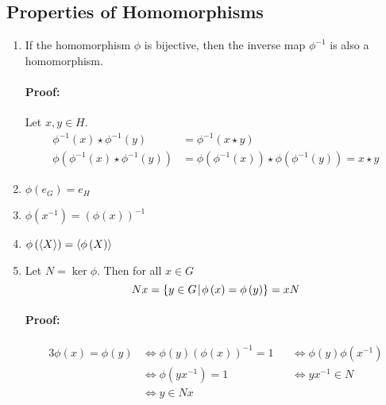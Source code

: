 \documentclass[12pt, oneside]{book}
\DeclarePairedDelimiter{\evdel}{\langle}{\rangle}
\newcommand{\ev}{\evdel}
\newcommand{\given}{\: \vline \:}
\begin{document}
\subsection{Properties of Homomorphisms}
\begin{enumerate}
	\item If the homomorphism \(\phi\) is bijective, then the inverse map \(\phi^{-1}\) is also a homomorphism.
	      \paragraph{Proof:} Let \(x,y \in H\).
	      \begin{align*}
		      \phi^{-1} \left( x \right) \star \phi^{-1} \left( y \right)                   & = \phi^{-1} \left( x \star y \right)                                                                        \\
		      \phi \left( \phi^{-1}\left( x \right) \star \phi^{-1}\left( y \right) \right) & = \phi \left( \phi^{-1} \left(x\right)\right) \star \phi \left( \phi^{-1} \left(y\right)\right) = x \star y
	      \end{align*}
	\item \(\phi\left(e_G\right) = e_H\)
	\item \(\phi\left(x^{-1}\right) = \left(\phi \left(x\right)\right)^{-1}\)
	\item \(\phi\left(\ev{X}\right) = \ev{\phi\left(X\right)}\)
	\item Let \(N = \ker \phi\). Then for all \(x \in G\)
	      \[ Nx = \{y \in G \given \phi \left(x\right) = \phi \left(y\right) \} = xN \]
	      \paragraph{Proof:}
	      \begin{alignat*}{3}
		      \phi \left(x\right) = \phi \left(y\right) & \Longleftrightarrow \phi \left(y\right) \left(\phi \left(x\right)\right)^{-1} = 1 &  & \Longleftrightarrow \phi \left(y\right) \phi\left(x^{-1}\right) \\
		                                                & \Longleftrightarrow \phi \left( yx^{-1} \right) = 1                               &  & \Longleftrightarrow yx^{-1} \in N                               \\
		                                                & \Longleftrightarrow y \in Nx                                                      &  &                                                                 \\
	      \end{alignat*}
\end{enumerate}
\end{document}
